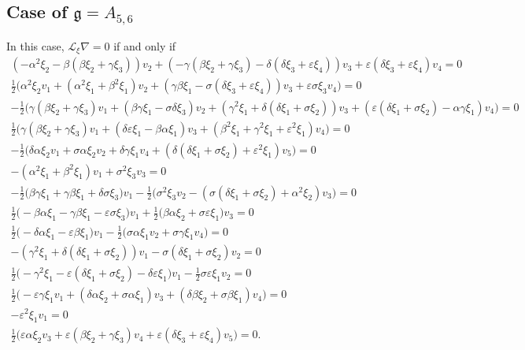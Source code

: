 \documentclass[10pt]{article}
\begin{document}
 \subsection{Case of $\mathfrak{g}=A_{5,6}$}               
In this case,
$\mathscr{L}_\xi\nabla=0$ if and only if \begin{eqnarray}
\left(-\alpha^2\xi_2 - \beta(\beta\xi_2 + \gamma\xi_3)\right)v_2 + \left(-\gamma(\beta\xi_2 + \gamma\xi_3) - \delta(\delta\xi_3 + \varepsilon\xi_4)\right)v_3 + \varepsilon(\delta\xi_3 + \varepsilon\xi_4)v_4=0\label{1}\\
\tfrac{1}{2}\Big(\alpha^2\xi_2v_1 + (\alpha^2\xi_1 + \beta^2\xi_1)v_2 + \left(\gamma\beta\xi_1 - \sigma(\delta\xi_3 + \varepsilon\xi_4)\right)v_3 + \varepsilon\sigma\xi_3v_4\Big)=0\\
-\tfrac{1}{2}\Big(\gamma(\beta\xi_2 + \gamma\xi_3)v_1 + (\beta\gamma\xi_1 - \sigma\delta\xi_3)v_2 + (\gamma^2\xi_1 + \delta(\delta\xi_1 + \sigma\xi_2))v_3 + (\varepsilon(\delta\xi_1 + \sigma\xi_2) - \alpha\gamma\xi_1)v_4\Big)=0\\
\tfrac{1}{2}\Big(\gamma(\beta\xi_2 + \gamma\xi_3)v_1 + (\delta\varepsilon\xi_1 - \beta\alpha\xi_1)v_3 + (\beta^2\xi_1 + \gamma^2\xi_1 + \varepsilon^2\xi_1)v_4\Big)=0\label{40}\\
-\tfrac{1}{2}\Big(\delta\alpha\xi_2v_1 + \sigma\alpha\xi_2v_2 + \delta\gamma\xi_1v_4 + (\delta(\delta\xi_1 + \sigma\xi_2) + \varepsilon^2\xi_1)v_5\Big)=0\\
-(\alpha^2\xi_1 + \beta^2\xi_1)v_1 + \sigma^2\xi_3v_3=0\label{6}\\
-\tfrac{1}{2}\Big(\beta\gamma\xi_1 + \gamma\beta\xi_1 + \delta\sigma\xi_3\Big)v_1 - \tfrac{1}{2}\Big(\sigma^2\xi_3v_2 - (\sigma(\delta\xi_1 + \sigma\xi_2) + \alpha^2\xi_2)v_3\Big)=0\\
\tfrac{1}{2}\Big(-\beta\alpha\xi_1 - \gamma\beta\xi_1 - \varepsilon\sigma\xi_3\Big)v_1 + \tfrac{1}{2}\Big(\beta\alpha\xi_2 + \sigma\varepsilon\xi_1\Big)v_3=0\\
\tfrac{1}{2}\Big(-\delta\alpha\xi_1 - \varepsilon\beta\xi_1\Big)v_1 - \tfrac{1}{2}\Big(\sigma\alpha\xi_1v_2 + \sigma\gamma\xi_1v_4\Big)=0\\
-\left(\gamma^2\xi_1 + \delta(\delta\xi_1 + \sigma\xi_2)\right)v_1 - \sigma(\delta\xi_1 + \sigma\xi_2)v_2=0\label{46}\\
\tfrac{1}{2}\Big(-\gamma^2\xi_1 - \varepsilon(\delta\xi_1 + \sigma\xi_2) - \delta\varepsilon\xi_1\Big)v_1 - \tfrac{1}{2}\sigma\varepsilon\xi_1v_2=0\\
\tfrac{1}{2}\Big(-\varepsilon\gamma\xi_1v_1 + (\delta\alpha\xi_2 + \sigma\alpha\xi_1)v_3 + (\delta\beta\xi_2 + \sigma\beta\xi_1)v_4\Big)=0\\
-\varepsilon^2\xi_1v_1=0\label{13}\\
\tfrac{1}{2}\Big(\varepsilon\alpha\xi_2v_3 + \varepsilon(\beta\xi_2 + \gamma\xi_3)v_4 + \varepsilon(\delta\xi_3 + \varepsilon\xi_4)v_5\Big)=0.   
\end{eqnarray}
\end{document}

